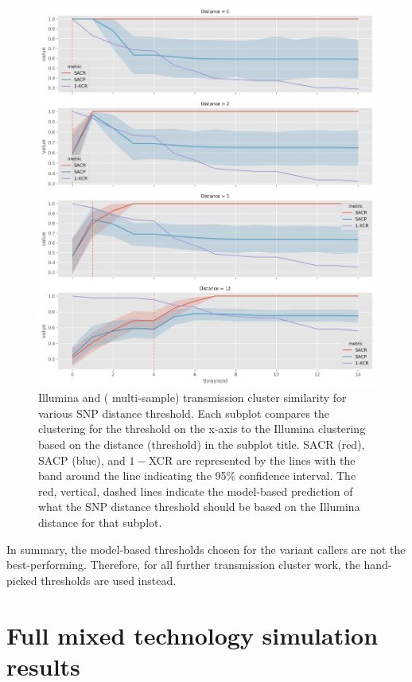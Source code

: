 \begin{figure}
\begin{center}
\includegraphics[width=0.90\columnwidth]{Appendix1/Figs/compare-threshold-sweep.png}
\caption{{Illumina and \ont{} (\pandora{} multi-sample) transmission cluster similarity for various SNP distance threshold. Each subplot compares the \ont{} clustering for the threshold on the x-axis to the Illumina clustering based on the distance (threshold) in the subplot title. SACR (red), SACP (blue), and $1-$XCR are represented by the lines with the band around the line indicating the 95\% confidence interval. The red, vertical, dashed lines indicate the model-based prediction of what the \ont{} SNP distance threshold should be based on the Illumina distance for that subplot.
{\label{fig:compare-dist-sweep}}%
}}
\end{center}
\end{figure}

\vspace{\baselineskip}
\noindent
In summary, the model-based thresholds chosen for the \ont{} variant callers are not the best-performing. Therefore, for all further transmission cluster work, the hand-picked thresholds are used instead.

\section{Full mixed technology simulation results}

